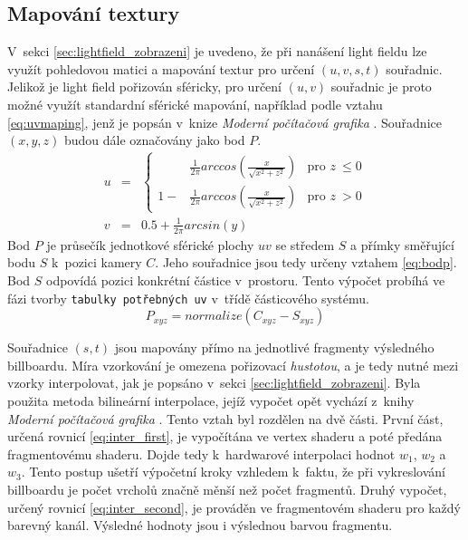 \subsection{Mapování textury}
\label{sec:texture_mapping}
V~sekci \ref{sec:lightfield_zobrazeni} je uvedeno, že při nanášení light fieldu lze využít pohledovou matici a mapování textur pro určení $(u, v, s, t)$ souřadnic. Jelikož je light field pořizován sféricky, pro určení $(u, v)$ souřadnic je proto možné využít standardní sférické mapování, například podle vztahu \ref{eq:uvmaping}, jenž je popsán v~knize \emph{Moderní počítačová grafika} \cite[kapitola 13.1.1]{zara2004moderni}. Souřadnice $(x,y,z)$ budou dále označovány jako bod $P$.
\begin{equation}
\label{eq:uvmaping}
    \begin{array}{lll}
        u& =& \left\{ 
        \begin{array}{ccl}
        & \frac{1}{2\pi}arccos(\frac{x}{\sqrt{x^2 + z^2}}) & \text{pro } z~\leq 0 \\
        1 - & \frac{1}{2\pi}arccos(\frac{x}{\sqrt{x^2 + z^2}}) & \text{pro } z~> 0
        \end{array} 
        \right. 
        \\[1cm]
        v& =& 0.5 + \frac{1}{2\pi}arcsin(y)
    \end{array}
\end{equation}
 Bod $P$ je průsečík jednotkové sférické plochy $uv$ se středem $S$ a přímky směřující bodu $S$ k~pozici kamery $C$. Jeho souřadnice jsou tedy určeny vztahem \ref{eq:bodp}. Bod $S$ odpovídá pozici konkrétní částice v~prostoru. Tento výpočet probíhá ve fázi tvorby \texttt{tabulky potřebných uv} v~třídě částicového systému.
\begin{equation}
\label{eq:bodp}
      P_{xyz} = normalize(C_{xyz} - S_{xyz})
\end{equation}

Souřadnice ${(s, t)}$ jsou mapovány přímo na jednotlivé fragmenty výsledného billboardu. Míra vzorkování je omezena pořizovací \emph{hustotou}, a je tedy nutné mezi vzorky interpolovat, jak je popsáno v~sekci \ref{sec:lightfield_zobrazeni}. Byla použita metoda bilineární interpolace, jejíž vypočet opět vychází z~knihy \emph{Moderní počítačová grafika} \cite[kapitola 22.6.4]{zara2004moderni}. Tento vztah byl rozdělen na dvě části. První část, určená rovnicí \ref{eq:inter_first}, je vypočítána ve vertex shaderu a poté předána fragmentovému shaderu. Dojde tedy k~hardwarové interpolaci hodnot ${w_1}$, ${w_2}$ a ${w_3}$. Tento postup ušetří výpočetní kroky vzhledem k~faktu, že při vykreslování billboardu je počet vrcholů značně měnší než počet fragmentů. Druhý vypočet, určený rovnicí \ref{eq:inter_second}, je prováděn ve fragmentovém shaderu pro každý barevný kanál. Výsledné hodnoty jsou i výslednou barvou fragmentu.   

